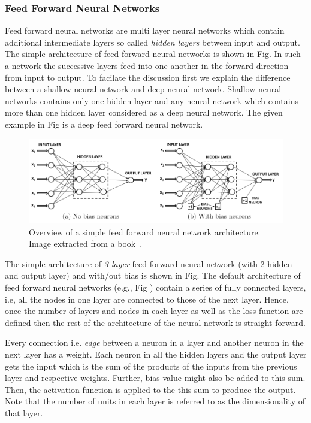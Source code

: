 \subsubsection{Feed Forward Neural Networks}
Feed forward neural networks are multi layer neural networks which contain additional intermediate layers so called \textit{hidden layers} between input and output. The simple architecture of feed forward neural networks is shown in Fig.
In such a network the successive layers feed into one another in the forward direction from input to output. To facilate the discussion first we explain the difference between a shallow neural network and deep neural network. Shallow neural networks contains only one hidden layer and any neural network which contains more than one hidden layer considered as a deep neural network. The given example in Fig is 
a deep feed forward neural network.

\begin{figure}[h]
\centering
 \includegraphics[width=\linewidth]{Figures/fig_ffnn.png}
 \caption{Overview of a simple feed forward neural network architecture. Image extracted from a book~\protect\cite{DBLP:books/sp/Aggarwal18}.}
 \label{fig:perceptron}
\end{figure}

The simple architecture of \textit{3-layer} feed forward neural network (with 2 hidden and output layer) and with/out bias is shown in Fig. %
The default architecture of feed forward neural networks (e.g., Fig ) contain a series of fully connected layers, i.e, all the nodes in one layer are connected to those of the next layer. Hence, once the number of layers and nodes in each layer as well as the loss function are defined then the rest of the architecture of the neural network is straight-forward.

Every connection i.e. \textit{edge} between a neuron in a layer and another neuron in the next layer has a weight. Each neuron in all the hidden layers and the output layer gets the input which is the sum of the products of the inputs from the previous layer and respective weights. Further, bias value might also be added to this sum. Then, the activation function is applied to the this sum to produce the output. Note that the number of units in each layer is referred to as the dimensionality of that layer.

